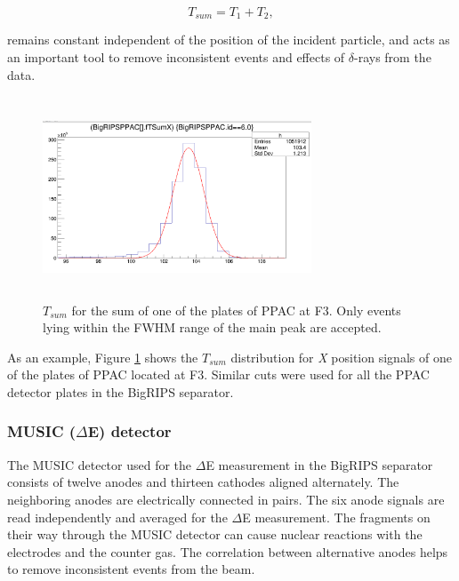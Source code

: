 \begin{equation}
T_{sum} = T_{1} + T_{2},
\end{equation}

remains constant independent of the position of the incident particle, and acts as an important tool to remove inconsistent events and effects of $\delta$-rays from the data.

\begin{figure}[h]
	\centering
	\includegraphics[width=8cm,height=6cm]{figures/PPAC_cut.png}
	\caption[]{$T_{sum}$ for the sum of one of the plates of PPAC at F3. Only events lying within the FWHM range of the main peak are accepted. }
	\label{fig:PPAC_cut}
\end{figure}

As an example, Figure \ref{fig:PPAC_cut} shows the $T_{sum}$ distribution for \textit{X} position signals of one of the plates of PPAC located at F3. Similar cuts were used for all the PPAC detector plates in the BigRIPS separator.

 
 
\subsubsection{MUSIC ($\Delta$E) detector}

The MUSIC detector used for the $\Delta$E measurement in the BigRIPS separator consists of twelve anodes and thirteen cathodes aligned alternately. The neighboring anodes are electrically connected in pairs. The six anode signals are read independently and averaged for the $\Delta$E measurement. The fragments on their way through the MUSIC detector can cause nuclear reactions with the electrodes and the counter gas. The correlation between alternative anodes helps to remove inconsistent events from the beam. 

